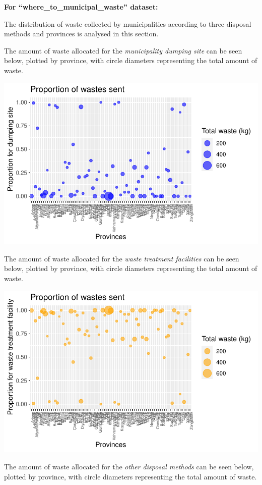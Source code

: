 \documentclass[
  11pt,
  a4paper,
  DIV=11,
  numbers=noendperiod]{scrartcl}
\begin{document}
{\textbf{For ``where\_to\_municipal\_waste'' dataset:}}

The distribution of waste collected by municipalities according to three
disposal methods and provinces is analysed in this section.

The amount of waste allocated for the \emph{municipality dumping site}
can be seen below, plotted by province, with circle diameters
representing the total amount of waste.

\includegraphics{project_files/figure-pdf/unnamed-chunk-17-1.pdf}

The amount of waste allocated for the \emph{waste treatment facilities}
can be seen below, plotted by province, with circle diameters
representing the total amount of waste.

\includegraphics{project_files/figure-pdf/unnamed-chunk-18-1.pdf}

The amount of waste allocated for the \emph{other disposal methods} can
be seen below, plotted by province, with circle diameters representing
the total amount of waste.
\end{document}
